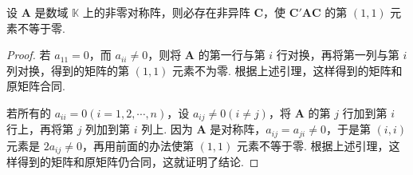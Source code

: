 \documentclass[../../main.tex]{subfiles}
\begin{document}
\begin{lemma}\label{lemma:非零对称阵合同于(1,1)元素不为零的矩阵}
设 $\boldsymbol{A}$ 是数域 $\mathbb{K}$ 上的非零对称阵，则必存在非异阵 $\boldsymbol{C}$，使 $\boldsymbol{C}'\boldsymbol{A}\boldsymbol{C}$ 的第 $(1,1)$ 元素不等于零.
\end{lemma}
\begin{proof}
若 $a_{11} = 0$，而 $a_{ii}\neq 0$，则将 $\boldsymbol{A}$ 的第一行与第 $i$ 行对换，再将第一列与第 $i$ 列对换，得到的矩阵的第 $(1,1)$ 元素不为零. 根据上述引理，这样得到的矩阵和原矩阵合同.

若所有的 $a_{ii}=0 (i = 1,2,\cdots,n)$，设 $a_{ij}\neq 0 (i\neq j)$，将 $\boldsymbol{A}$ 的第 $j$ 行加到第 $i$ 行上，再将第 $j$ 列加到第 $i$ 列上. 因为 $\boldsymbol{A}$ 是对称阵，$a_{ij}=a_{ji}\neq 0$，于是第 $(i,i)$ 元素是 $2a_{ij}\neq 0$，再用前面的办法使第 $(1,1)$ 元素不等于零. 根据上述引理，这样得到的矩阵和原矩阵仍合同，这就证明了结论. 
\end{proof}
\end{document}
